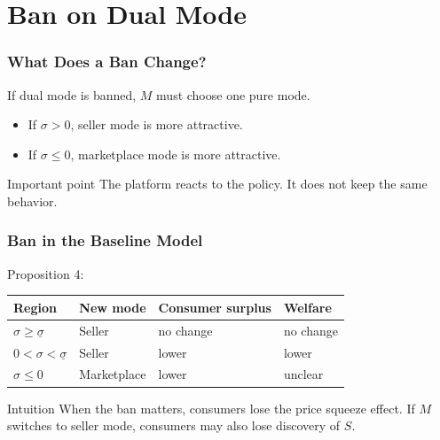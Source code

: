 \documentclass[aspectratio=169,AutoFakeBold,AutoFakeSlant]{beamer}
\begin{document}
\section{Ban on Dual Mode}

\begin{frame}
  \frametitle{What Does a Ban Change?}
  \small
  If dual mode is banned, $M$ must choose one pure mode.

  \begin{itemize}
    \item If $\sigma>0$, seller mode is more attractive.
    \item If $\sigma\leq 0$, marketplace mode is more attractive.
  \end{itemize}

  \begin{block}{Important point}
    The platform reacts to the policy. It does not keep the same behavior.
  \end{block}
\end{frame}

\begin{frame}
  \frametitle{Ban in the Baseline Model}
  \small
  Proposition 4:

  \begin{center}
    \begin{tabular}{llll}
      \toprule
      Region & New mode & Consumer surplus & Welfare \\
      \midrule
      $\sigma\geq\underline{\sigma}$ & Seller & no change & no change \\
      $0<\sigma<\underline{\sigma}$ & Seller & lower & lower \\
      $\sigma\leq0$ & Marketplace & lower & unclear \\
      \bottomrule
    \end{tabular}
  \end{center}

  \begin{alertblock}{Intuition}
    When the ban matters, consumers lose the price squeeze effect. If $M$ switches to seller mode, consumers may also lose discovery of $S$.
  \end{alertblock}
\end{frame}
\end{document}
